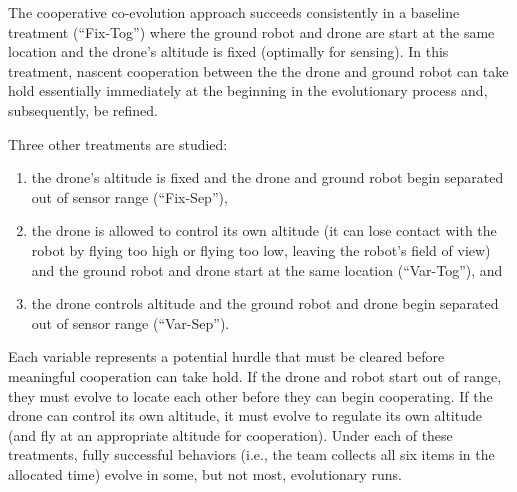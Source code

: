 The cooperative co-evolution approach succeeds consistently in a baseline treatment (``Fix-Tog'') where the ground robot and drone are start at the same location and the drone's altitude is fixed (optimally for sensing).
In this treatment, nascent cooperation between the the drone and ground robot can take hold essentially immediately at the beginning in the evolutionary process and, subsequently, be refined.

Three other treatments are studied:
\begin{enumerate}
\item the drone's altitude is fixed and the drone and ground robot begin separated out of sensor range (``Fix-Sep''),
\item the drone is allowed to control its own altitude (it can lose contact with the robot by flying too high or flying too low, leaving the robot's field of view) and the ground robot and drone start at the same location (``Var-Tog''), and
\item the drone controls altitude and the ground robot and drone begin separated out of sensor range (``Var-Sep'').
\end{enumerate}
Each variable represents a potential hurdle that must be cleared before meaningful cooperation can take hold.
If the drone and robot start out of range, they must evolve to locate each other before they can begin cooperating.
If the drone can control its own altitude, it must evolve to regulate its own altitude (and fly at an appropriate altitude for cooperation).
Under each of these treatments, fully successful behaviors (i.e., the team collects all six items in the allocated time) evolve in some, but not most, evolutionary runs.

